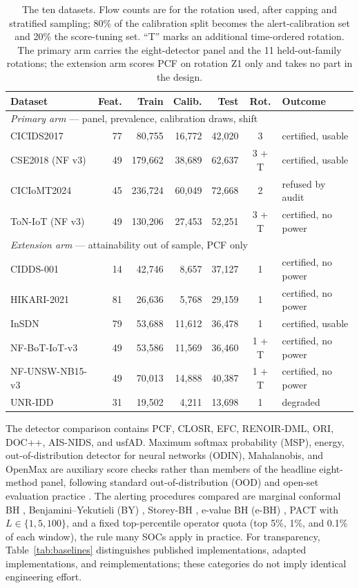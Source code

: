 \documentclass[a4paper,fleqn]{cas-dc}
\newcommand{\PACT}{PACT\xspace}
\newcommand{\PCF}{PCF\xspace}
\begin{document}
\begin{table}[t]
\centering
\caption{The ten datasets. Flow counts are for the rotation used, after capping and stratified sampling; 80\% of the calibration split becomes the alert-calibration set and 20\% the score-tuning set. ``T'' marks an additional time-ordered rotation. The primary arm carries the eight-detector panel and the 11 held-out-family rotations; the extension arm scores PCF on rotation Z1 only and takes no part in the design.}
\label{tab:datasets}
\scriptsize
\setlength{\tabcolsep}{3pt}
\begin{tabular}{lrrrrcl}
\toprule
Dataset & Feat. & Train & Calib. & Test & Rot. & Outcome \\
\midrule
\multicolumn{7}{l}{\emph{Primary arm} — panel, prevalence, calibration draws, shift}\\
CICIDS2017 & 77 & 80{,}755 & 16{,}772 & 42{,}020 & 3 & certified, usable \\
CSE2018 (NF v3) & 49 & 179{,}662 & 38{,}689 & 62{,}637 & 3 + T & certified, usable \\
CICIoMT2024 & 45 & 236{,}724 & 60{,}049 & 72{,}668 & 2 & refused by audit \\
ToN-IoT (NF v3) & 49 & 130{,}206 & 27{,}453 & 52{,}251 & 3 + T & certified, no power \\
\midrule
\multicolumn{7}{l}{\emph{Extension arm} — attainability out of sample, PCF only}\\
CIDDS-001 & 14 & 42{,}746 & 8{,}657 & 37{,}127 & 1 & certified, no power \\
HIKARI-2021 & 81 & 26{,}636 & 5{,}768 & 29{,}159 & 1 & certified, no power \\
InSDN & 79 & 53{,}688 & 11{,}612 & 36{,}478 & 1 & certified, usable \\
NF-BoT-IoT-v3 & 49 & 53{,}586 & 11{,}569 & 36{,}460 & 1 + T & certified, no power \\
NF-UNSW-NB15-v3 & 49 & 70{,}013 & 14{,}888 & 40{,}387 & 1 + T & certified, no power \\
UNR-IDD & 31 & 19{,}502 & 4{,}211 & 13{,}698 & 1 & degraded \\
\bottomrule
\end{tabular}
\end{table}
The detector comparison contains \PCF, CLOSR, EFC, RENOIR-DML, ORI, DOC++, AIS-NIDS, and usfAD. Maximum softmax probability (MSP), energy, out-of-distribution detector for neural networks (ODIN), Mahalanobis, and OpenMax are auxiliary score checks rather than members of the headline eight-method panel, following standard out-of-distribution (OOD) and open-set evaluation practice \cite{hendrycks2017baseline,liang2018odin,vaze2022openset}. The alerting procedures compared are marginal conformal BH \cite{benjamini1995controlling,bates2023outliers}, Benjamini--Yekutieli (BY) \cite{benjamini2001yekutieli}, Storey-BH \cite{storey2002direct}, e-value BH (e-BH) \cite{wang2022ebh}, \PACT with $L\in\{1,5,100\}$, and a fixed top-percentile operator quota (top 5\%, 1\%, and 0.1\% of each window), the rule many SOCs apply in practice. For transparency, Table~\ref{tab:baselines} distinguishes published implementations, adapted implementations, and reimplementations; these categories do not imply identical engineering effort.
\end{document}

